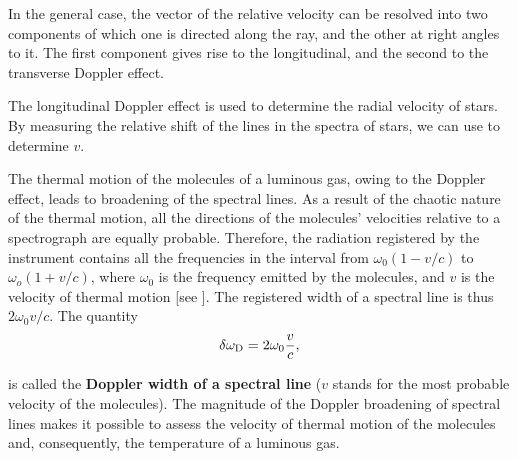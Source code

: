 In the general case, the vector of the relative velocity can be resolved into two components of which one is directed along the ray, and the other at right angles to it.
The first component gives rise to the longitudinal, and the second to the transverse Doppler effect.

The longitudinal Doppler effect is used to determine the radial velocity of stars.
By measuring the relative shift of the lines in the spectra of stars, we can use  to determine $v$.

The thermal motion of the molecules of a luminous gas, owing to the Doppler effect, leads to broadening of the spectral lines.
As a result of the chaotic nature of the thermal motion, all the directions of the molecules' velocities relative to a spectrograph are equally probable.
Therefore, the radiation registered by the instrument contains all the frequencies in the interval from $\omega_0(1 - v/c)$ to $\omega_o (1 + v/c)$, where $\omega_0$ is the frequency emitted by the molecules, and $v$ is the velocity of thermal motion [see ].
The registered width of a spectral line is thus $2\omega_0v/c$.
The quantity
\begin{equation}\label{eq:21_18}
	\delta{\omega_{\text{D}}} = 2\omega_0 \frac{v}{c},
\end{equation}

\noindent
is called the \textbf{Doppler width of a spectral line} ($v$ stands for the most probable velocity of the molecules).
The magnitude of the Doppler broadening of spectral lines makes it possible to assess the velocity of thermal motion of the molecules and, consequently, the temperature of a luminous gas.
